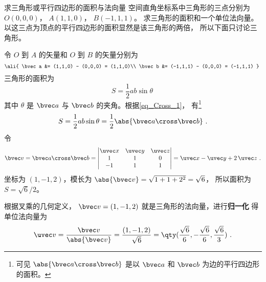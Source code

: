 \begin{example}{求三角形或平行四边形的面积与法向量}\label{ex_Cross_1}
空间直角坐标系中三角形的三点分别为 $O(0,0,0)$，  $A(1,1,0)$，  $B(-1,1,1)$。 求三角形的面积和一个单位法向量。 以这三点为顶点的平行四边形的面积显然是该三角形的两倍， 所以下面只讨论三角形。

令 $O$ 到 $A$ 的矢量和  $O$ 到 $B$ 的矢量分别为
\begin{equation}
\ali{
\bvec a  &= (1,1,0) - (0,0,0) = (1,1,0)\\
\bvec b  &= (-1,1,1) - (0,0,0) = (-1,1,1)
}~\end{equation}
三角形的面积为
 \begin{equation}
S = \frac12 ab \sin \theta ~
\end{equation}
其中 $\theta $ 是 $\bvec a$ 与 $\bvec b$ 的夹角。根据\autoref{eq_Cross_1}， 有\footnote{可见 $\abs{\bvec a\cross\bvec b}$ 是以 $\bvec a$ 和 $\bvec b$ 为边的平行四边形的面积。}
\begin{equation}
S = \frac12 ab \sin \theta  = \frac12 \abs{\bvec a\cross\bvec b}~.
\end{equation}
令
\begin{equation}
\bvec v = \bvec a \cross \bvec b = 
\begin{vmatrix} \uvec x & \uvec y & \uvec z \\ 1&1&0\\-1&1&1 \end{vmatrix}
= \uvec x - \uvec y + 2\,\uvec z ~.
\end{equation}
坐标为 $(1,-1,2)$，模长为 $\abs{\bvec v} = \sqrt{1 + 1 + 2^2} = \sqrt 6$， 所以面积为 $S = \sqrt 6 /2$。 

根据叉乘的几何定义， $\bvec v = (1,-1,2)$ 就是三角形的法向量，进行\textbf{归一化}
得单位法向量为
 \begin{equation}
\uvec v = \frac{\bvec v}{\abs{\bvec v}} = \frac{(1,-1,2)}{\sqrt 6} = \qty( \frac{\sqrt 6 }{6}, - \frac{\sqrt 6 }{6}, \frac{\sqrt 6 }{3} )~.
\end{equation}
\end{example}

